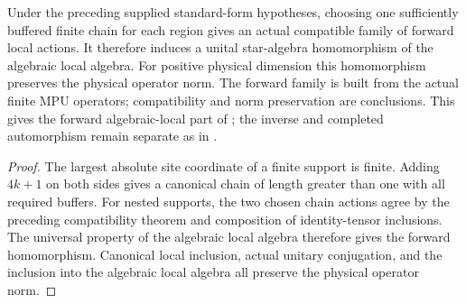\begin{lemma}
    \label{thm:mpu_finite_heisenberg_forward_local_action}
    \leanok
    Under the preceding supplied standard-form hypotheses, choosing one
    sufficiently buffered finite chain for each region gives an actual
    compatible family of forward local actions. It therefore induces
    a unital star-algebra homomorphism of the algebraic local algebra.
    For positive physical dimension this homomorphism preserves the
    physical operator norm. The forward family is built from the
    actual finite MPU operators; compatibility and norm preservation
    are conclusions. This gives the forward algebraic-local part of
    \cite[lines~2292--2306]{Cirac2017MPU}; the inverse and completed
    automorphism remain separate as in
    \cite{gap:mpu_qca_complete_block_heisenberg_scope}.
\end{lemma}
\begin{proof}\leanok
    The largest absolute site coordinate of a finite support is finite.
    Adding $4k+1$ on both sides gives a canonical chain of length greater
    than one with all required buffers. For nested supports, the two
    chosen chain actions agree by the preceding compatibility theorem
    and composition of identity-tensor inclusions. The universal
    property of the algebraic local algebra therefore gives the forward
    homomorphism. Canonical local inclusion, actual unitary conjugation,
    and the inclusion into the algebraic local algebra all preserve the
    physical operator norm.
\end{proof}

